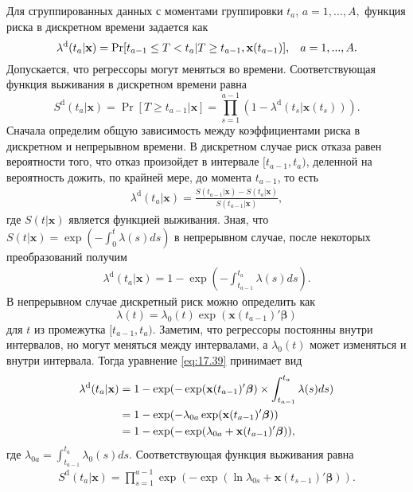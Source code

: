 \noindent
Для сгруппированных данных с моментами группировки $t_a$, $a=1,...,A,$ функция риска в дискретном времени задается как
        $$\lambda^{\mathrm{d}}(t_a|\mathbf{x})=\Pr[t_{a-1}\le T<t_a|T\ge t_{a-1},\mathbf{x}(t_{a-1})], \hspace{0.3cm} a=1,...,A.$$
Допускается, что регрессоры могут меняться во времени. Соответствующая функция выживания в дискретном времени равна
        $$S^{\mathrm{d}}(t_a|\mathbf{x})=\Pr[T\ge t_{a-1}|\mathbf{x}]=\prod^{a-1}_{s=1}\left(1-\lambda^{\mathrm{d}}(t_s|\mathbf{x}(t_s))\right).$$
Сначала определим общую зависимость между коэффициентами риска в дискретном и непрерывном времени. В дискретном случае риск отказа равен вероятности того, что отказ произойдет в интервале $[t_{a-1},t_a)$, деленной на вероятность дожить, по крайней мере, до момента $t_{a-1}$, то есть
        \begin{align}
        \label{eq:17.38}
        \lambda^{\mathrm{d}}(t_a|\mathbf{x})=\frac{S(t_{a-1}|\mathbf{x})-S(t_{a}|\mathbf{x})}{S(t_{a-1}|\mathbf{x})},
        \end{align}
где $S(t|\mathbf{x})$ является функцией выживания. Зная, что $S(t|\mathbf{x}) = \exp(-\int^{t}_{0}\lambda(s)ds)$ в непрерывном случае, после некоторых преобразований получим
        \begin{align}
        \label{eq:17.39}
        \lambda^{\mathrm{d}}(t_a|\mathbf{x})=1-\exp(-\int^{t_a}_{t_{a-1}}\lambda(s)ds).
        \end{align}
В непрерывном случае дискретный риск можно определить как
        $$\lambda(t)=\lambda_0(t)\exp(\mathbf{x}(t_{a-1})'\bm{\beta})$$
для $t$ из промежутка $[t_{a-1},t_a)$. Заметим, что регрессоры постоянны внутри интервалов, но могут меняться между интервалами, а $\lambda_0(t)$ может изменяться и внутри интервала. Тогда уравнение \ref{eq:17.39} принимает вид
        \begin{align}
        \label{eq:17.40}
        \lambda^{\mathrm{d}}(t_a|\mathbf{x})&=1-\exp(-\exp(\mathbf{x}(t_{a-1})'\bm{\beta})\times\int^{t_a}_{t_{a-1}}\lambda(s)ds)\\
        &=1-\exp(-\lambda_{0a}\exp(\mathbf{x}(t_{a-1})'\bm{\beta}))\notag\\
        &=1-\exp(-\exp(\lambda_{0a}+\mathbf{x}(t_{a-1})'\bm{\beta})),\notag
        \end{align}
где $\lambda_{0a}=\int^{t_a}_{t_{a-1}}\lambda_{0}(s)ds$. Соответствующая функция выживания равна
        \begin{align}
        \label{eq:17.41}
        S^{\mathrm{d}}(t_a|\mathbf{x})=\prod^{a-1}_{s=1}\exp\left(-\exp(\ln\lambda_{0s}+\mathbf{x}(t_{s-1})'\bm{\beta})\right).
        \end{align}

